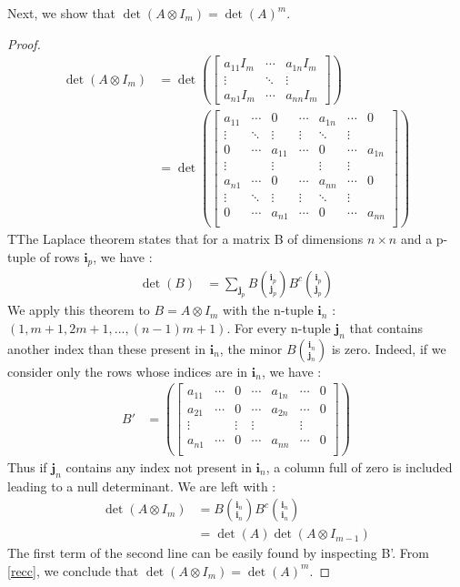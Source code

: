 \documentclass[11pt]{article}
\newcommand{\kp}{\otimes} %
\begin{document}
Next, we show that \(\det(A \kp I_m) = \det(A)^m\).
\begin{proof}
\begin{align*}
\det(A \kp I_m) &= \det \left(\begin{bmatrix}
a_{11} I_m & \cdots & a_{1n} I_m \\
\vdots & \ddots & \vdots \\
a_{n1} I_m & \cdots & a_{nn} I_m
\end{bmatrix}\right)\\
&=\det \left(\begin{bmatrix}
a_{11} & \cdots & 0 & \cdots & a_{1n} & \cdots & 0\\
\vdots & \ddots & \vdots & \vdots & \ddots & \vdots \\
0 & \cdots & a_{11} & \cdots & 0 & \cdots & a_{1n}\\
\vdots &  & \vdots &  & \vdots & \vdots \\
a_{n1} & \cdots & 0 & \cdots & a_{nn} & \cdots & 0\\
\vdots & \ddots & \vdots & \vdots & \ddots & \vdots \\
0 & \cdots & a_{n1} & \cdots & 0 & \cdots & a_{nn}\\
\end{bmatrix}\right)
\end{align*}
TThe Laplace theorem states that for a matrix B of dimensions \(n\times n\) and a p-tuple of rows $\bm{i}_p$, we have :
\begin{align*}
\det(B) &= \sum_{\bm{j}_p} B {\bm{i}_p\choose \bm{j}_p} B^c {\bm{i}_p\choose \bm{j}_p}
\end{align*}
We apply this theorem to $B=A \kp I_m$ with the n-tuple $\bm{i}_n$ : $(1,m+1,2m+1,...,(n-1)m+1)$. For every n-tuple $\bm{j}_n$ that contains another index than these present in $\bm{i}_n$, the minor $B {\bm{i}_n\choose \bm{j}_n}$ is zero. Indeed, if we consider only the rows whose indices are in $\bm{i}_n$, we have :
\begin{align*}
B'&=\left(\begin{bmatrix}
a_{11} & \cdots & 0 & \cdots & a_{1n} & \cdots & 0\\
a_{21} & \cdots & 0 & \cdots & a_{2n} & \cdots & 0\\
\vdots & & \vdots & \vdots & & \vdots \\
a_{n1} & \cdots & 0 & \cdots & a_{nn} & \cdots & 0\\
\end{bmatrix}\right)
\end{align*}
Thus if $\bm{j}_n$ contains any index not present in $\bm{i}_n$, a column full of zero is included leading to a null determinant. We are left with :
\begin{align}
\det(A \kp I_m) &= B {\bm{i}_n\choose \bm{i}_n} B^c {\bm{i}_n\choose \bm{i}_n}\\ \label{recc}
&= \det(A) \det(A \kp I_{m-1})
\end{align}
The first term of the second line can be easily found by inspecting B'.
From \ref{recc}, we conclude that \(\det(A \kp I_m) = \det(A)^m\).
\end{proof}
\end{document}
